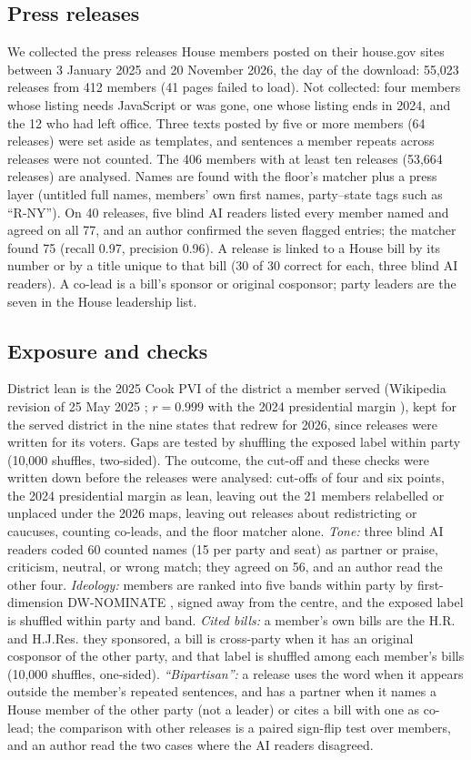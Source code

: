 \documentclass[9pt,twocolumn,twoside]{pnas-new}
\begin{document}
{\subsection*{Press releases}
We collected the press releases House members posted on their house.gov sites between 3 January 2025 and 20 November
2026, the day of the download: 55,023 releases from 412 members (41 pages failed to load). Not collected: four members
whose listing needs JavaScript or was gone, one whose listing ends in 2024, and the 12 who had left office. Three texts
posted by five or more members (64 releases) were set aside as templates, and sentences a member repeats across
releases were not counted. The 406 members with at least ten releases (53,664 releases) are analysed. Names are found
with the floor's matcher plus a press layer (untitled full names, members' own first names, party--state tags such as
``R-NY''). On 40 releases, five blind AI readers listed every member named and agreed on all 77, and an author
confirmed the seven flagged entries; the matcher found 75 (recall 0.97, precision 0.96). A release is linked to a
House bill by its number or by a title unique to that bill (30 of 30 correct for each, three blind AI readers). A
co-lead is a bill's sponsor or original cosponsor; party leaders are the seven in the House leadership list.

\subsection*{Exposure and checks}
District lean is the 2025 Cook PVI \cite{cook2025pvi} of the district a member served (Wikipedia revision of 25 May
2025 \cite{wikipedia2025pvi}; $r = 0.999$ with the 2024 presidential margin \cite{downballot2024}), kept for the served
district in the nine states that redrew for 2026, since releases were written for its voters. Gaps are tested by
shuffling the exposed label within party (10,000 shuffles, two-sided). The outcome, the cut-off and these checks were
written down before the releases were analysed: cut-offs of four and six points, the 2024 presidential margin as lean,
leaving out the 21 members relabelled or unplaced under the 2026 maps, leaving out releases about redistricting or
caucuses, counting co-leads, and the floor matcher alone. \emph{Tone:} three blind AI readers coded 60 counted names (15
per party and seat) as partner or praise, criticism, neutral, or wrong match; they agreed on 56, and an author read the
other four. \emph{Ideology:} members are ranked into five bands within party by first-dimension DW-NOMINATE
\cite{voteview2026}, signed away from the centre, and the exposed label is shuffled within party and band.
\emph{Cited bills:} a member's own bills are the H.R. and H.J.Res. they sponsored, a bill is cross-party when it has an
original cosponsor of the other party, and that label is shuffled among each member's bills (10,000 shuffles,
one-sided). \emph{``Bipartisan'':} a release uses the word when it appears outside the member's repeated sentences, and
has a partner when it names a House member of the other party (not a leader) or cites a bill with one as co-lead; the
comparison with other releases is a paired sign-flip test over members, and an author read the two cases where the AI
readers disagreed.

}
\end{document}
